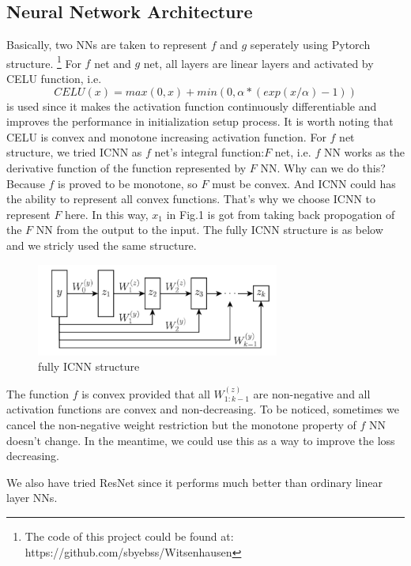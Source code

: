 \documentclass[conference,compsoc]{IEEEtran}
\begin{document}
\subsection{Neural Network Architecture}
 Basically, two NNs are taken to represent $f$ and $g$ seperately using Pytorch structure. \footnote{The code of this project could be found at: https://github.com/sbyebss/Witsenhausen}
For $f$ net and $g$ net, all layers are linear layers and activated by CELU\cite{barron2017continuously} function, i.e. 
\begin{equation}
  CELU(x)=max(0,x)+min(0,\alpha*(exp(x/\alpha)-1))
\end{equation}
is used since it makes the activation function continuously differentiable and improves the performance in initialization setup process. It is worth noting that CELU is convex and monotone increasing activation function.
For $f$ net structure, we tried ICNN as $f$ net's integral function:$F$ net, i.e. $f$ NN works as the derivative function of the function represented by $F$ NN. Why can we do this? Because $f$ is proved to be monotone, so $F$ must be convex. And ICNN could has the ability to represent all convex functions. That's why we choose ICNN to represent $F$ here. In this way, $x_1$ in Fig.1 is got from taking back propogation of the $F$ NN from the output to the input. The fully ICNN structure is as below and we stricly used the same structure.
\begin{figure}[htp]
  \centering
  \includegraphics[width=8cm]{images/ICNN.png}
  \caption{fully ICNN structure}
  \label{fig:definition}
\end{figure}

The function $f$ is convex provided that all $W_{1:k-1}^{(z)}$ are non-negative and all activation functions are convex and non-decreasing.\cite{amos2017input} To be noticed, sometimes we cancel the non-negative weight restriction but the monotone property of $f$ NN doesn't change. In the meantime, we could use this as a way to improve the loss decreasing.

We also have tried ResNet\cite{he2016deep} since it performs much better than ordinary linear layer NNs. 
\end{document}
